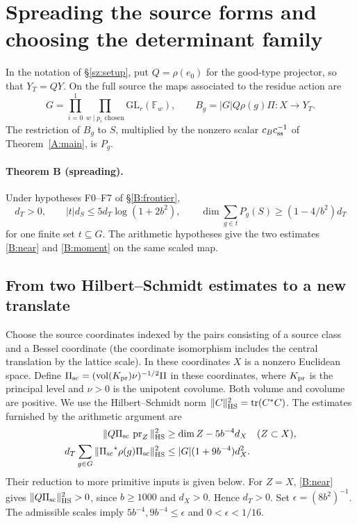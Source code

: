 \section{Spreading the source forms and choosing the determinant family}
\label{B:section}

In the notation of \S\ref{sz:setup}, put \(Q=\rho(e_0)\)
for the good-type projector, so that \(Y_T=QY\).
On the full source the maps associated to the residue action are
\[
  G=\prod_{i=0}^1\prod_{w\mid p_i\text{ chosen}}\mathrm{GL}_r(\mathbb F_w),
  \qquad B_g=|G|Q\rho(g)\Pi:X\longrightarrow Y_T.
\]
The restriction of \(B_g\) to \(S\), multiplied by the nonzero
scalar \(c_B c_{\rm ss}^{-1}\) of Theorem~\ref{A:main}, is \(P_g\).

\paragraph{Theorem B (spreading).}
Under hypotheses F0--F7 of \S\ref{B:frontier},
\begin{equation}
\label{B:theorem}
 d_T>0,\qquad
 |t|d_S\le5d_T\log(1+2b^2),\qquad
 \dim\sum_{g\in t}P_g(S)\ge(1-4/b^2)d_T
\end{equation}
for one finite set \(t\subseteq G\).
The arithmetic hypotheses give the two estimates
\eqref{B:near} and \eqref{B:moment} on the same scaled map.

\subsection{From two Hilbert--Schmidt estimates to a new translate}
\label{B:one}
Choose the source coordinates indexed by the pairs consisting of a
source class and a Bessel coordinate (the coordinate isomorphism
includes the central translation by the lattice scale).
In these coordinates \(X\) is a nonzero Euclidean space. Define
\({\Pi_{\rm sc}}=(\operatorname{vol}(K_{\rm pr})\nu)^{-1/2}\Pi\) in these coordinates,
where \(K_{\rm pr}\) is the principal level and \(\nu>0\) is the unipotent
covolume. Both volume and covolume are positive. We use the Hilbert--Schmidt norm
\(\|C\|_{\rm HS}^2=\operatorname{tr}(C^*C)\).
The estimates furnished by the arithmetic argument are
\begin{align}
 \|Q{\Pi_{\rm sc}}\,\operatorname{pr}_Z\|_{\rm HS}^2
 &\ge \dim Z-5b^{-4}d_X\quad(Z\subset X), \label{B:near}\\
 d_T\sum_{g\in G}\|{\Pi_{\rm sc}}^*\rho(g){\Pi_{\rm sc}}\|_{\rm HS}^2
 &\le |G|(1+9b^{-4})d_X^2. \label{B:moment}
\end{align}
Their reduction to more primitive inputs is given below.
For \(Z=X\), \eqref{B:near} gives \(\|Q{\Pi_{\rm sc}}\|_{\rm HS}^2>0\),
since \(b\ge1000\) and \(d_X>0\). Hence \(d_T>0\).
Set \(\epsilon=(8b^2)^{-1}\). The admissible scales imply
\(5b^{-4},9b^{-4}\le\epsilon\) and \(0<\epsilon<1/16\).

